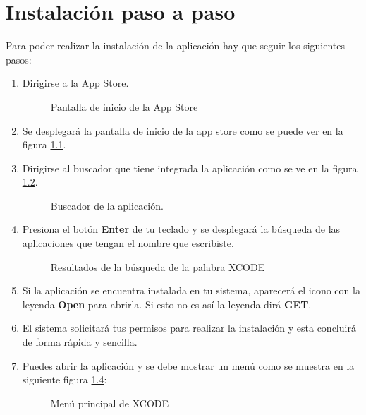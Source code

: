 \chapter{Instalación paso a paso}

Para poder realizar la instalación de la aplicación hay que seguir los siguientes pasos:

\begin{enumerate}
	\item Dirigirse a la App Store.
		\begin{figure}[hbtp!]
	\begin{center}	
			\label{fig:appstore}
			\caption{Pantalla de inicio de la App Store}
		\end{center}
	\end{figure}
		
	\item Se desplegará la pantalla de inicio de la app store como se puede ver en la figura \ref{fig:appstore}.

	\item Dirigirse al buscador que tiene integrada la aplicación como se ve en la figura \ref{fig:buscador}.	
	\begin{figure}[hbtp!]
		\begin{center}	
			\label{fig:buscador}
			\caption{Buscador de la aplicación.}
		\end{center}
	\end{figure}
	
	\break
	
	\item Presiona el botón \textbf{Enter} de tu teclado y se desplegará la búsqueda de las aplicaciones que tengan el nombre que escribiste.

\begin{figure}[hbtd!]
	\begin{center}	
		\label{fig:busqueda}
		\caption{Resultados de la búsqueda de la palabra XCODE}
	\end{center}
\end{figure}

	\item Si la aplicación se encuentra instalada en tu sistema, aparecerá el icono con la leyenda \textbf{Open} para abrirla. Si esto no es así la leyenda dirá \textbf{GET}.
	
	\item El sistema solicitará tus permisos para realizar la instalación y esta concluirá de forma rápida y sencilla.
	
	\item Puedes abrir la aplicación y se debe mostrar un menú como se muestra en la siguiente figura \ref{fig:menu}:
\begin{figure}[hbtp!]
	\begin{center}	
		\label{fig:menu}
		\caption{Menú principal de XCODE}
	\end{center}
\end{figure}

\end{enumerate}